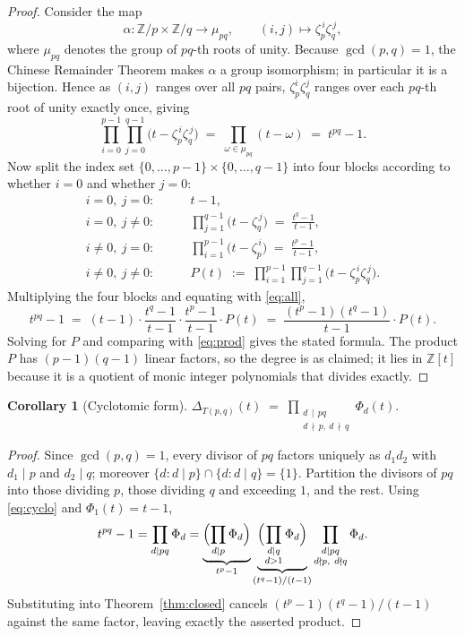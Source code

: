 \documentclass[11pt]{article}
\newtheorem{corollary}[theorem]{Corollary}
\theoremstyle{definition}
\newcommand{\Deltaa}{\Delta}
\newcommand{\T}[2]{T(#1,#2)}
\newcommand{\Cyc}[1]{\Phi_{#1}}
\newcommand{\Z}{\mathbb{Z}}
\begin{document}
\begin{proof}
Consider the map
\[
\alpha \colon \Z/p \times \Z/q \longrightarrow \mu_{pq},
\qquad
(i,j) \longmapsto \zeta_{p}^{\,i}\zeta_{q}^{\,j},
\]
where $\mu_{pq}$ denotes the group of $pq$-th roots of unity. Because $\gcd(p,q)=1$,
the Chinese Remainder Theorem makes $\alpha$ a group isomorphism; in particular it is
a bijection. Hence as $(i,j)$ ranges over all $pq$ pairs, $\zeta_{p}^{i}\zeta_{q}^{j}$
ranges over each $pq$-th root of unity exactly once, giving
\begin{equation}\label{eq:all}
\prod_{i=0}^{p-1}\prod_{j=0}^{q-1}\bigl(t-\zeta_{p}^{\,i}\zeta_{q}^{\,j}\bigr)
\;=\;
\prod_{\omega \in \mu_{pq}} (t-\omega)
\;=\;
t^{pq}-1 .
\end{equation}
Now split the index set $\{0,\dots,p-1\}\times\{0,\dots,q-1\}$ into four blocks
according to whether $i=0$ and whether $j=0$:
\begin{align*}
i=0,\ j=0:&\qquad t-1,\\[2pt]
i=0,\ j\neq 0:&\qquad \prod_{j=1}^{q-1}\bigl(t-\zeta_{q}^{\,j}\bigr) \;=\; \frac{t^{q}-1}{t-1},\\[2pt]
i\neq 0,\ j=0:&\qquad \prod_{i=1}^{p-1}\bigl(t-\zeta_{p}^{\,i}\bigr) \;=\; \frac{t^{p}-1}{t-1},\\[2pt]
i\neq 0,\ j\neq 0:&\qquad P(t) \;:=\; \prod_{i=1}^{p-1}\prod_{j=1}^{q-1}\bigl(t-\zeta_{p}^{\,i}\zeta_{q}^{\,j}\bigr).
\end{align*}
Multiplying the four blocks and equating with \eqref{eq:all},
\[
t^{pq}-1
\;=\;
(t-1)\cdot\frac{t^{q}-1}{t-1}\cdot\frac{t^{p}-1}{t-1}\cdot P(t)
\;=\;
\frac{(t^{p}-1)(t^{q}-1)}{t-1}\cdot P(t).
\]
Solving for $P$ and comparing with \eqref{eq:prod} gives the stated formula. The
product $P$ has $(p-1)(q-1)$ linear factors, so the degree is as claimed; it lies in
$\Z[t]$ because it is a quotient of monic integer polynomials that divides exactly.
\end{proof}

\begin{corollary}[Cyclotomic form]\label{cor:cyclo}
$\displaystyle \Deltaa_{\T{p}{q}}(t) \;=\; \prod_{\substack{d \,\mid\, pq \\ d \,\nmid\, p,\ d \,\nmid\, q}} \Cyc{d}(t).$
\end{corollary}

\begin{proof}
Since $\gcd(p,q)=1$, every divisor of $pq$ factors uniquely as $d_{1}d_{2}$ with
$d_{1}\mid p$ and $d_{2}\mid q$; moreover $\{d : d\mid p\} \cap \{d : d\mid q\} = \{1\}$.
Partition the divisors of $pq$ into those dividing $p$, those dividing $q$ and
exceeding $1$, and the rest. Using \eqref{eq:cyclo} and $\Cyc{1}(t)=t-1$,
\[
t^{pq}-1
= \prod_{d \mid pq}\Cyc{d}
= \underbrace{\Bigl(\prod_{d\mid p}\Cyc{d}\Bigr)}_{t^{p}-1}
  \underbrace{\Bigl(\prod_{\substack{d\mid q \\ d>1}}\Cyc{d}\Bigr)}_{(t^{q}-1)/(t-1)}
  \prod_{\substack{d\mid pq\\ d\nmid p,\ d\nmid q}}\Cyc{d}.
\]
Substituting into Theorem~\ref{thm:closed} cancels $(t^{p}-1)(t^{q}-1)/(t-1)$ against
the same factor, leaving exactly the asserted product.
\end{proof}
\end{document}
